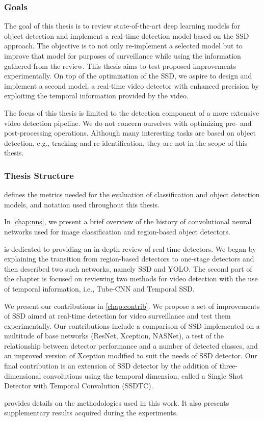 \subsubsection{Goals}
The goal of this thesis is to review state-of-the-art deep learning models for object detection and implement a real-time detection model based on the SSD approach. The objective is to not only re-implement a selected model but to improve that model for purposes of surveillance while using the information gathered from the review. This thesis aims to test proposed improvements experimentally. On top of the optimization of the SSD, we aspire to design and implement a second model, a real-time video detector with enhanced precision by exploiting the temporal information provided by the video.

The focus of this thesis is limited to the detection component of a more extensive video detection pipeline. We do not concern ourselves with optimizing pre- and post-processing operations. Although many interesting tasks are based on object detection, e.g., tracking and re-identification, they are not in the scope of this thesis.

\subsubsection{Thesis Structure}
 defines the metrics needed for the evaluation of classification and object detection models, and notation used throughout this thesis. 

In \cref{chap:nns}, we present a brief overview of the history of convolutional neural networks used for image classification and region-based object detectors. 

 is dedicated to providing an in-depth review of real-time detectors. We began by explaining the transition from region-based detectors to one-stage detectors and then described two such networks, namely SSD and YOLO. The second part of the chapter is focused on reviewing two methods for video detection with the use of temporal information, i.e., Tube-CNN and Temporal SSD. 

We present our contributions in \cref{chap:contrib}. We propose a set of improvements of SSD aimed at real-time detection for video surveillance and test them experimentally. Our contributions include a comparison of SSD implemented on a multitude of base networks (ResNet, Xception, NASNet), a test of the relationship between detector performance and a number of detected classes, and an improved version of Xception modified to suit the needs of SSD detector. Our final contribution is an extension of SSD detector by the addition of three-dimensional convolutions using the temporal dimension, called a Single Shot Detector with Temporal Convolution (SSDTC).

 provides details on the methodologies used in this work. It also presents supplementary results acquired during the experiments.